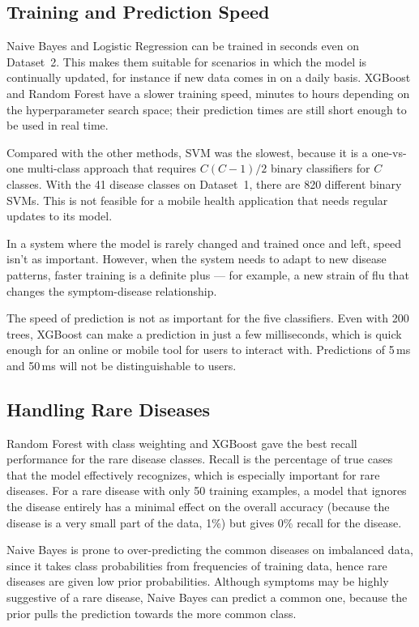 \subsection{Training and Prediction Speed}

Naive Bayes and Logistic Regression can be trained in seconds even on Dataset~2. This makes them suitable for scenarios in which the model is continually updated, for instance if new data comes in on a daily basis. XGBoost and Random Forest have a slower training speed, minutes to hours depending on the hyperparameter search space; their prediction times are still short enough to be used in real time.

Compared with the other methods, SVM was the slowest, because it is a one-vs-one multi-class approach that requires $C(C-1)/2$ binary classifiers for $C$ classes. With the 41 disease classes on Dataset~1, there are 820 different binary SVMs. This is not feasible for a mobile health application that needs regular updates to its model.

In a system where the model is rarely changed and trained once and left, speed isn't as important. However, when the system needs to adapt to new disease patterns, faster training is a definite plus --- for example, a new strain of flu that changes the symptom-disease relationship.

The speed of prediction is not as important for the five classifiers. Even with 200 trees, XGBoost can make a prediction in just a few milliseconds, which is quick enough for an online or mobile tool for users to interact with. Predictions of 5\,ms and 50\,ms will not be distinguishable to users.

\subsection{Handling Rare Diseases}

Random Forest with class weighting and XGBoost gave the best recall performance for the rare disease classes. Recall is the percentage of true cases that the model effectively recognizes, which is especially important for rare diseases. For a rare disease with only 50 training examples, a model that ignores the disease entirely has a minimal effect on the overall accuracy (because the disease is a very small part of the data, 1\%) but gives 0\% recall for the disease.

Naive Bayes is prone to over-predicting the common diseases on imbalanced data, since it takes class probabilities from frequencies of training data, hence rare diseases are given low prior probabilities. Although symptoms may be highly suggestive of a rare disease, Naive Bayes can predict a common one, because the prior pulls the prediction towards the more common class.

